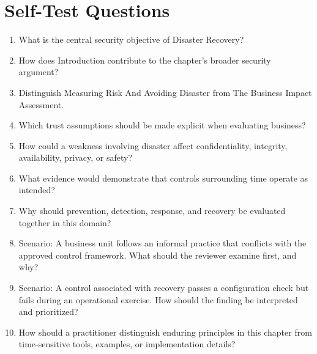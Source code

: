 \documentclass[11pt]{article}
\begin{document}
\section*{Self-Test Questions}
\begin{enumerate}
\item What is the central security objective of Disaster Recovery?
\item How does Introduction contribute to the chapter's broader security argument?
\item Distinguish Measuring Risk And Avoiding Disaster from The Business Impact Assessment.
\item Which trust assumptions should be made explicit when evaluating business?
\item How could a weakness involving disaster affect confidentiality, integrity, availability, privacy, or safety?
\item What evidence would demonstrate that controls surrounding time operate as intended?
\item Why should prevention, detection, response, and recovery be evaluated together in this domain?
\item Scenario: A business unit follows an informal practice that conflicts with the approved control framework. What should the reviewer examine first, and why?
\item Scenario: A control associated with recovery passes a configuration check but fails during an operational exercise. How should the finding be interpreted and prioritized?
\item How should a practitioner distinguish enduring principles in this chapter from time-sensitive tools, examples, or implementation details?
\end{enumerate}
\end{document}
